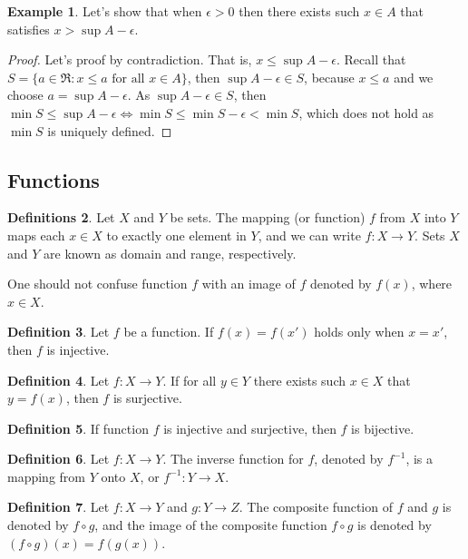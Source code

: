 \documentclass[12pt,a4paper]{article}
\theoremstyle{definition}
\newtheorem{defn}{Definition}[section]
\newtheorem{defns}[defn]{Definitions}
\newtheorem{example}[defn]{Example}
\begin{document}
\begin{example}
Let's show that when $\epsilon > 0$ then there exists such $x \in A$ that
satisfies $x > \sup A - \epsilon$.
\begin{proof}
Let's proof by contradiction. That is, $x \leq \sup A - \epsilon$. Recall that
$S = \{ a \in \Re : x \leq a \text{ for all } x \in A \}$, then $\sup A -
\epsilon \in S$, because $x \leq a$ and we choose $a = \sup A - \epsilon$. As
$\sup A - \epsilon \in S$, then $\min S \leq \sup A - \epsilon \Leftrightarrow
\min S \leq \min S - \epsilon < \min S$, which does not hold as $\min S$ is
uniquely defined.
\end{proof}
\end{example}

\subsection{Functions}
\begin{defns}
Let $X$ and $Y$ be sets. The mapping (or function) $f$ from $X$ into $Y$ maps
each $x \in X$ to exactly one element in $Y$, and we can write $f: X
\rightarrow Y$. Sets $X$ and $Y$ are known as domain and range, respectively.
\end{defns}
One should not confuse function $f$ with an image of $f$ denoted by $f(x)$,
where $x \in X$.
\begin{defn}
Let $f$ be a function. If $f(x) = f(x')$ holds only when $x = x'$, then $f$ is
injective.
\end{defn}

\begin{defn}
Let $f: X \rightarrow Y$. If for all $y \in Y$ there exists such $x \in X$ that
$y = f(x)$, then $f$ is surjective.
\end{defn}

\begin{defn}
If function $f$ is injective and surjective, then $f$ is bijective.
\end{defn}

\begin{defn}
Let $f: X \rightarrow Y$. The inverse function for $f$, denoted by $f^{-1}$, is
a mapping from $Y$ onto $X$, or $f^{-1}: Y \rightarrow X$.
\end{defn}

\begin{defn}
Let $f: X \rightarrow Y$ and $g: Y \rightarrow Z$. The composite function of
$f$ and $g$ is denoted by $f \circ g$, and the image of the composite function
$f \circ g$ is denoted by $(f \circ g)(x) = f(g(x))$.
\end{defn}
\end{document}
